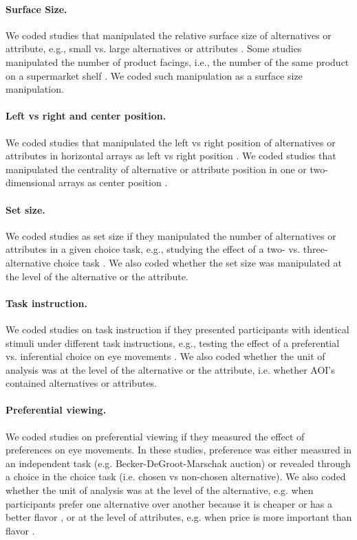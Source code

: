 \paragraph{Surface Size.} We coded studies that manipulated the relative surface size of alternatives or attribute, e.g., small vs. large alternatives or attributes \citep{lohse1997a}. Some studies manipulated the number of product facings, i.e., the number of the same product on a supermarket shelf \citep{chandon2009a}. We coded such manipulation as a surface size manipulation. 

\paragraph{Left vs right and center position.} We coded studies that manipulated the left vs right position of alternatives or attributes in horizontal arrays as left vs right position \citep{kreplin2014a}. We coded studies that manipulated the centrality of alternative or attribute position in one or two-dimensional arrays as center position \citep[experiment 1A \& 1B in][]{atalay2012a,meissner2016a}.

\paragraph{Set size.} We coded studies as set size if they manipulated the number of alternatives or attributes in a given choice task, e.g., studying the effect of a two- vs. three-alternative choice task \citep{hong2016a}. We also coded whether the set size was manipulated at the level of the alternative or the attribute. 

\paragraph{Task instruction.} We coded studies on task instruction if they presented participants with identical stimuli under different task instructions, e.g., testing the effect of a preferential  vs. inferential choice on eye movements \citep{orquin2019a}. We also coded whether the unit of analysis was at the level of the alternative or the attribute, i.e. whether AOI's contained alternatives or attributes. 

\paragraph{Preferential viewing.} We coded studies on preferential viewing if they measured the effect of preferences on eye movements. In these studies, preference was either measured in an independent task (e.g. Becker-DeGroot-Marschak auction) or revealed through a choice in the choice task (i.e. chosen vs non-chosen alternative). We also coded whether the unit of analysis was at the level of the alternative, e.g. when participants prefer one alternative over another because it is cheaper or has a better flavor \citep{gidloef2017a}, or at the level of attributes, e.g. when price is more important than flavor \citep{meissner2016a}. 

